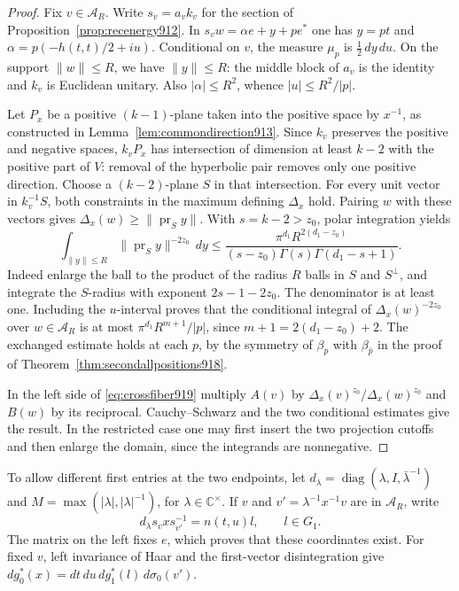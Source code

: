 \documentclass[a4paper,11pt]{article}
\theoremstyle{definition}
\theoremstyle{remark}
\numberwithin{equation}{section}
\begin{document}
\begin{proof}
Fix \(v\in\mathcal A_R\). Write \(s_v=a_vk_v\) for the section
of Proposition~\ref{prop:recenergy912}. In
\(s_vw=\alpha e+y+p e^*\) one has \(y=pt\) and
\(\alpha=p(-h(t,t)/2+iu)\). Conditional on \(v\), the
measure \(\mu_p\) is \(\tfrac12\,dy\,du\). On the support
\(\|w\|\le R\), we have \(\|y\|\le R\): the middle block of
\(a_v\) is the identity and \(k_v\) is Euclidean unitary.
Also \(|\alpha|\le R^2\), whence \(|u|\le R^2/|p|\).

Let \(P_x\) be a positive \((k-1)\)-plane taken into the
positive space by \(x^{-1}\), as constructed in
Lemma~\ref{lem:commondirection913}. Since \(k_v\) preserves
the positive and negative spaces, \(k_vP_x\) has intersection
of dimension at least \(k-2\) with the positive part of
\(V\): removal of the hyperbolic pair removes only one positive
direction. Choose a \((k-2)\)-plane \(S\) in that intersection.
For every unit vector in \(k_v^{-1}S\), both constraints in
the maximum defining \(\Delta_x\) hold. Pairing \(w\) with
these vectors gives
\(\Delta_x(w)\ge\|\operatorname{pr}_S y\|\).
With \(s=k-2>z_0\), polar integration yields
\[
 \int_{\|y\|\le R}\|\operatorname{pr}_S y\|^{-2z_0}\,dy
 \le\frac{\pi^{d_1}R^{2(d_1-z_0)}}
 {(s-z_0)\Gamma(s)\Gamma(d_1-s+1)} .
\]
Indeed enlarge the ball to the product of the radius \(R\)
balls in \(S\) and \(S^\perp\), and integrate the \(S\)-radius
with exponent \(2s-1-2z_0\). The denominator is at least one.
Including the \(u\)-interval proves that the conditional
integral of \(\Delta_x(w)^{-2z_0}\) over \(w\in\mathcal A_R\)
is at most \(\pi^{d_1}R^{m+1}/|p|\), since \(m+1=2(d_1-z_0)+2\).
The exchanged estimate holds at each \(p\), by the symmetry
of \(\beta_p\) with \(\beta_{\bar p}\) in the proof of
Theorem~\ref{thm:secondallpositions918}.

In the left side of \eqref{eq:crossfiber919} multiply \(A(v)\)
by \(\Delta_x(v)^{z_0}/\Delta_x(w)^{z_0}\) and \(B(w)\)
by its reciprocal. Cauchy--Schwarz and the two conditional
estimates give the result. In the restricted case one may
first insert the two projection cutoffs and then enlarge the
domain, since the integrands are nonnegative.
\end{proof}

To allow different first entries at the two endpoints, let
\(d_\lambda=\operatorname{diag}(\lambda,I,\bar\lambda^{-1})\)
and \(M=\max(|\lambda|,|\lambda|^{-1})\), for
\(\lambda\in\mathbb C^\times\). If \(v\) and
\(v'=\lambda^{-1}x^{-1}v\) are in \(\mathcal A_R\), write
\[
             d_\lambda s_v x s_{v'}^{-1}=n(t,u)l,
                      \qquad l\in G_1 .
\]
The matrix on the left fixes \(e\), which proves that these
coordinates exist. For fixed \(v\), left invariance of Haar
and the first-vector disintegration give
\(dg_0^*(x)=dt\,du\,dg_1^*(l)\,d\sigma_0(v')\).
\end{document}
